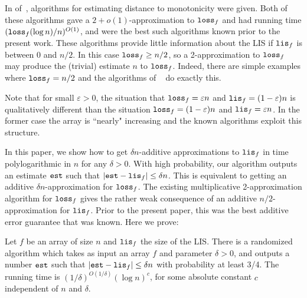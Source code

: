 \documentclass{acmsmall}
\newcommand{\lis}{{\tt lis}}
\newcommand{\est}{{\tt est}}
\newcommand{\loss}{{\tt loss}}
\begin{document}
In
of~\cite{PRR04,ACCL1}, algorithms for estimating  
distance 
to monotonicity were given.  Both of these algorithms  gave a $2+o(1)$-approximation to $\loss_f$  and
had running time $(\loss_f (\log n)/n)^{O(1)}$, and were the best such algorithms known prior to the present work.
These algorithms 
provide little information about the LIS if $\lis_f$ is between $0$ and $n/2$. 
In this case $\loss_f \geq n/2$, so a 2-approximation to $\loss_f$ may produce the (trivial) estimate $n$ to $\loss_f$.
Indeed, there are simple examples where $\loss_f=n/2$
and the algorithms of ~\cite{PRR04,ACCL1} do exactly this.

Note that for small $\varepsilon>0$,
the situation that $\loss_f=\varepsilon n$ and $\lis_f=(1-\varepsilon) n$
is qualitatively different than the situation $\loss_f=(1-\varepsilon)n$ and $\lis_f = \varepsilon n$.
In the former case the array is ``nearly"
increasing and the known algorithms exploit this structure. 


In this paper, we show how to get $\delta n$-additive approximations
to $\lis_f$ in time polylogarithmic in $n$ for any $\delta >0$.
With high probability, our algorithm outputs an estimate $\est$ such that $|\est - \lis_f| \leq \delta n$.
This is equivalent to getting an additive $\delta n$-approximation
for $\loss_f$.
The existing multiplicative 2-approximation algorithm for $\loss_f$ 
gives the rather weak consequence of an additive $n/2$-approximation for $\lis_f$.
Prior to the present paper, this was the best additive error guarantee that was known.  Here we prove:

\begin{theorem} \label{thm:main} Let $f$ be an array of size $n$
and $\lis_f$ the size of the LIS.
There is a randomized algorithm 
which takes as input an array $f$ and  parameter $\delta > 0$, and outputs
a number $\est$ such that
$|\est - \lis_f| \leq \delta n$ with probability at least 3/4. The running time
is $(1/\delta)^{O(1/\delta)} (\log n)^c$, for some
absolute constant $c$ independent of $n$ and $\delta$.
\end{theorem}
\end{document}
